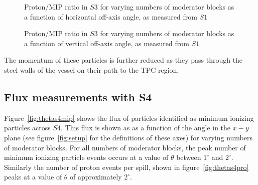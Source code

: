 \begin{figure}[!ht]
  \begin{minipage}[t]{0.48\textwidth}
    \begin{adjustbox}{max totalsize={\textwidth}{.35\textheight}, center}
      
    \end{adjustbox}
    \caption{Proton/MIP ratio in $\mathit{S3}$ for varying numbers of moderator blocks as a function of horizontal off-axis angle, as measured from $\mathit{S1}$}
    \label{fig:propiratio_s3_horz}
  \end{minipage}
  \hspace{0.3cm}
  \begin{minipage}[t]{0.48\textwidth}
    \begin{adjustbox}{max totalsize={\textwidth}{.35\textheight}, center}
      
    \end{adjustbox}
    \caption{Proton/MIP ratio in $\mathit{S3}$ for varying numbers of moderator blocks as a function of vertical off-axis angle, as measured from $\mathit{S1}$}
    \label{fig:propiratio_s3_vert}
  \end{minipage}	
\end{figure}

The momentum of these particles is further reduced as they pass through the steel walls of the vessel on their path to the TPC region.

\subsection{Flux measurements with S4}

Figure~\ref{fig:thetas4mip} shows the flux of particles identified as minimum ionizing particles across $\mathit{S4}$.
This flux is shown as as a function of the angle in the $x-y$ plane (see figure~\ref{fig:setup} for the definitions of these axes) for varying numbers of moderator blocks.
For all numbers of moderator blocks, the peak number of minimum ionizing particle events occurs at a value of $\theta$ between $1^{\circ}$ and $2^{\circ}$.
Similarly the number of proton events per spill, shown in figure~\ref{fig:thetas4pro} peaks at a value of $\theta$ of approximately $2^{\circ}$.


